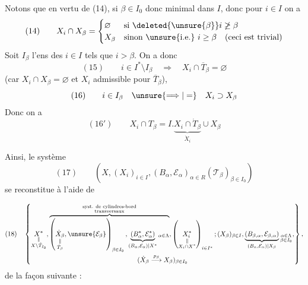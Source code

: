 Notons que en vertu de (14), si $\beta\in I_0$ donc
minimal dans $I$, donc pour $i\in I$ on a
\[
(14)\qquad
X_i\cap X_\beta=
\begin{cases}
\varnothing & \text{si }\deleted{\unsure{\beta}}i\not\ge\beta\\
X_\beta & \text{sinon \unsure{i.e.} }i\ge\beta\quad(\text{ceci est trivial})
\end{cases}
\]
Soit $I_\beta$ l'ens des $i\in I$ tels que $i>\beta$.
On a donc
\[
(15)\qquad i\in I^*\setminus I_\beta\quad\Longrightarrow\quad
X_i\cap\overline T_\beta=\varnothing
\]
(car $X_i\cap X_\beta=\varnothing$ et $X_i$ admissible pour $\overline T_\beta$),
\[
(16)\qquad i\in I_\beta\quad\unsure{\Longrightarrow|=}\quad X_i\supset X_\beta
\]
Donc on a
\[
(16')\qquad X_i\cap T_\beta
=I.\underbrace{X_i\cap\dot T_\beta}_{\dot X_i}\cup X_\beta
\]

Ainsi, le système
\[
(17)\qquad
(X,(X_i)_{i\in I},(B_\alpha,\mathcal E_\alpha)_{\alpha\in R}
(\mathcal T_\beta)_{\beta\in I_0})
\]
se reconstitue à l'aide de


\[
(18)\quad\left\{
\begin{gathered}
\underset{\substack{\parallel\\X\setminus\mathring T_{I_0}}}{X^*},
\overbrace{
\left(\underset{\substack{\parallel\\\dot T_\beta}}{\dot X_\beta},
\unsure{\mathcal E_\beta}\right)_{\beta\in I_0},
\underbrace{(B_\alpha^*,\mathcal E_\alpha^*)}
_{(B_\alpha,\mathcal E_\alpha)|X^*}{}_{\alpha\in\Lambda}
}^{\substack{\text{syst. de cylindres-bord}\\\text{transversaux}}},
\left(\underset{\substack{\parallel\\X_i\cap X^*}}{X_i^*}\right)_{i\in I^*};
(X_\beta)_{\beta\in I},
\underbrace{(B_{\beta,\alpha},\mathcal E_{\beta,\alpha})}
_{(B_\alpha,\mathcal E_\alpha)|X_\beta}
{}_{\substack{\alpha\in\Lambda\\\beta\in I_0}},\\
(\dot X_\beta\overset{p_\beta}\longrightarrow X_\beta)_{\beta\in I_0}
\end{gathered}\right\},
\]
de la façon suivante :

